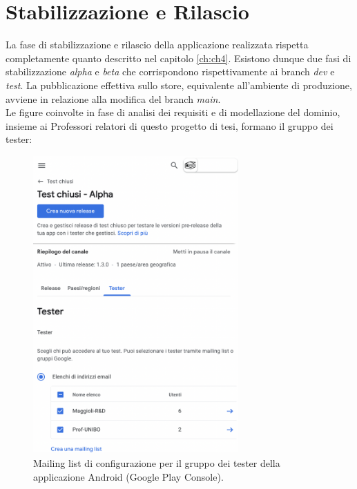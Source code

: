 \section{Stabilizzazione e Rilascio}

La fase di stabilizzazione e rilascio della applicazione realizzata rispetta completamente quanto descritto nel capitolo \ref{ch:ch4}. Esistono dunque due fasi di stabilizzazione \textit{alpha} e \textit{beta} che corrispondono rispettivamente ai branch \textit{dev} e \textit{test}. La pubblicazione effettiva sullo store, equivalente all'ambiente di produzione, avviene in relazione alla modifica del branch \textit{main}.\\
Le figure coinvolte in fase di analisi dei requisiti e di modellazione del dominio, insieme ai Professori relatori di questo progetto di tesi, formano il gruppo dei tester:
\begin{figure}[H]
\centering
    \includegraphics[width=0.7\textwidth]{img/Screenshot 2022-09-28 at 14.41.54.png}
    \caption{Mailing list di configurazione per il gruppo dei tester della applicazione Android (Google Play Console).}
    \label{mailinglisttester}
\end{figure}

